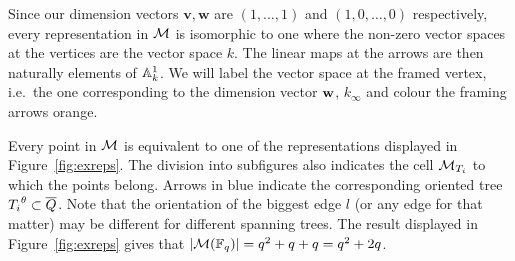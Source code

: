 \documentclass{amsart}
\theoremstyle{definition}
\begin{document}
Since our dimension vectors $\mathbf{v}, \mathbf{w}$ are $(1,\dots,1)$ and $(1,0,\ldots, 0)$ respectively, every representation in $\mathcal{M}$ is isomorphic to one where the non-zero vector spaces at the vertices are the vector space $k$.
The linear maps at the arrows are then naturally elements of $\mathbb{A}^1_k$.
We will label the vector space at the framed vertex, i.e.\ the one corresponding to the dimension vector $\mathbf{w}$, $k_\infty$ and colour the framing arrows {\color{orange} orange}.

Every point in $\mathcal{M}$ is equivalent to one of the representations displayed in Figure~\ref{fig:exreps}.
The division into subfigures also indicates the cell $\mathcal{M}_{T_i}$ to which the points belong.
Arrows in {\blue blue} indicate the corresponding oriented tree ${T_i}^\theta \subset {\overline{Q}}$.
Note that the orientation of the biggest edge $l$ (or any edge for that matter) may be different for different spanning trees.
The result displayed in Figure~\ref{fig:exreps} gives that $|\mathcal{M}(\mathbb{F}_q)|=q^2+q+q=q^2+2q$.
\end{document}
